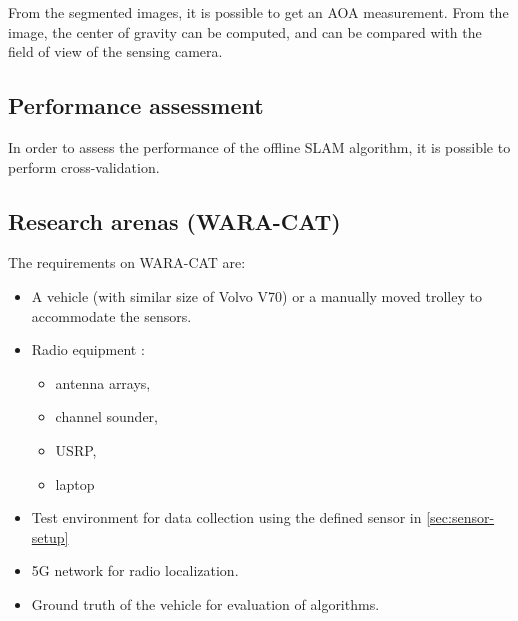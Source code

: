 From the segmented images, it is possible to get an \gls{AOA}
measurement. From the image, the center of gravity can be computed,
and can be compared with the field of view of the sensing camera.

\subsection{Performance assessment}

In order to assess the performance of the offline \gls{SLAM}
algorithm, it is possible to perform cross-validation.

\subsection{Research arenas (WARA-CAT)}


The requirements on WARA-CAT are:
\begin{itemize}
\item A vehicle (with similar size of Volvo V70) or a manually moved
  trolley to accommodate the sensors.
\item Radio equipment :
  \begin{itemize}
  \item   antenna arrays,
  \item  channel sounder,
  \item USRP,
  \item laptop
  \end{itemize}
  \item Test environment for data collection using the defined sensor in
    \ref{sec:sensor-setup}
\item 5G network for radio localization.
\item Ground truth of the vehicle for evaluation of algorithms.
\end{itemize}


